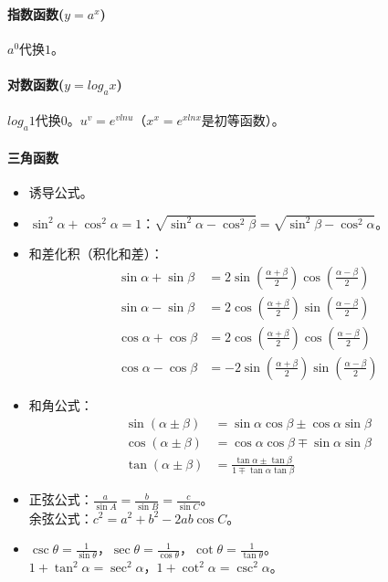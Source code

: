 \documentclass[
12pt, %
a4paper, 
oneside, %
headinclude,footinclude, %
]{scrartcl}
\begin{document}
\paragraph{指数函数($ y =a ^x $)}
$ a^0 $代换$ 1 $。
\paragraph{对数函数($ y = log_a x $)}
$ log_a 1 $代换$ 0 $。$ u^v = e^{v ln u} $（$ x^x = e^{x ln x} $是初等函数）。
\paragraph{三角函数}
\begin{itemize}
\item 诱导公式。
\item $ \sin^2\alpha + \cos^2\alpha = 1 $：$ \sqrt{\sin^2\alpha - \cos^2\beta} = \sqrt{\sin^2\beta - \cos^2\alpha} $。
\item 和差化积（积化和差）：
\begin{align*}
\sin\alpha + \sin\beta &= 2 \sin(\frac{\alpha + \beta}{2}) \cos(\frac{\alpha - \beta}{2}) \\
\sin\alpha - \sin\beta &= 2 \cos(\frac{\alpha + \beta}{2}) \sin(\frac{\alpha - \beta}{2}) \\
\cos\alpha + \cos\beta &= 2 \cos(\frac{\alpha + \beta}{2}) \cos(\frac{\alpha - \beta}{2}) \\
\cos\alpha - \cos\beta &= -2 \sin(\frac{\alpha + \beta}{2}) \sin(\frac{\alpha - \beta}{2})
\end{align*}
\item 和角公式：
\begin{align*}
\sin(\alpha \pm \beta) &= \sin\alpha \cos\beta \pm \cos\alpha \sin\beta \\
\cos(\alpha \pm \beta) &= \cos\alpha \cos\beta \mp \sin\alpha \sin\beta \\
\tan(\alpha \pm \beta) &= \frac{\tan\alpha \pm \tan\beta}{1 \mp \tan\alpha \tan\beta}
\end{align*}
\item 正弦公式：$ \frac{a}{\sin A} = \frac{b}{\sin B} = \frac{c}{\sin C} $。 \\
余弦公式：$ c^2 = a^2 + b^2 - 2ab\cos C $。
\item $ \csc\theta = \frac{1}{\sin\theta} $，$ \sec\theta = \frac{1}{\cos\theta} $，$ \cot\theta = \frac{1}{\tan\theta} $。 \\
$ 1 + \tan^2\alpha = \sec^2\alpha $，$ 1+\cot^2\alpha = \csc^2\alpha $。
\end{itemize}
\end{document}

